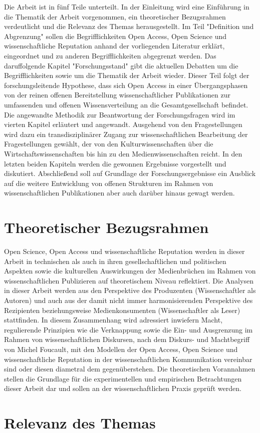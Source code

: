 Die Arbeit ist in fünf Teile unterteilt. In der Einleitung wird eine Einführung in die Thematik der Arbeit vorgenommen, ein theoretischer Bezugsrahmen verdeutlicht und die Relevanz des Themas herausgestellt. Im Teil "Definition und Abgrenzung" sollen die Begrifflichkeiten Open Access, Open Science und wissenschaftliche Reputation anhand der vorliegenden Literatur erklärt, eingeordnet und zu anderen Begrifflichkeiten abgegrenzt werden. Das daruffolgende Kapitel "Forschungsstand" gibt die aktuellen Debatten um die Begrifflichkeiten sowie um die Thematik der Arbeit wieder. Dieser Teil folgt der forschungsleitende Hypothese, dass sich Open Access in einer Übergangsphasen von der reinen offenen Bereitstellung wissenschaftlicher Publikationen zur umfassenden und offenen Wissensverteilung an die Gesamtgesellschaft befindet. Die angewandte Methodik zur Beantwortung der Forschungsfragen wird im vierten Kapitel erläutert und angewandt. Ausgehend von den Fragestellungen wird dazu ein transdisziplinärer Zugang zur wissenschaftlichen Bearbeitung der Fragestellungen gewählt, der von den Kulturwissenschaften über die Wirtschaftswissenschaften bis hin zu den Medienwissenschaften reicht. In den letzten beiden Kapiteln werden die gewonnen Ergebnisse vorgestellt und diskutiert. Abschließend soll auf Grundlage der Forschungsergebnisse ein Ausblick auf die weitere Entwicklung von offenen Strukturen im Rahmen von wissenschaftlichen Publikationen aber auch darüber hinaus gewagt werden.

\section{Theoretischer Bezugsrahmen} 

Open Science, Open Access und wissenschaftliche Reputation werden in dieser Arbeit in technischen als auch in ihren gesellschaftlichen und politischen Aspekten sowie die kulturellen Auswirkungen der Medienbrüchen im Rahmen von wissenschaftlichen Publizieren auf theoretischem Niveau reflektiert. Die Analysen in dieser Arbeit werden aus den Perspektive des Produzenten (Wissenschaftler als Autoren) und auch aus der damit nicht immer harmonisierenden Perspektive des Rezipienten beziehungsweise Medienkonsumenten (Wissenschaftler als Leser) stattfinden. In diesem Zusammenhang wird adressiert inwiefern Macht, regulierende Prinzipien wie die Verknappung sowie die Ein- und Ausgrenzung im Rahmen von wissenschaftlichen Diskursen, nach dem Diskurs- und Machtbegriff von Michel Foucault, mit den Modellen der Open Access, Open Science und wissenschaftliche Reputation in der wissenschaftlichen Kommunikation vereinbar sind oder diesen diametral dem gegenüberstehen. Die theoretischen Vorannahmen stellen die Grundlage für die experimentellen und empirischen Betrachtungen dieser Arbeit dar und sollen an der wissenschaftlichen Praxis geprüft werden.

\section{Relevanz des Themas} 

